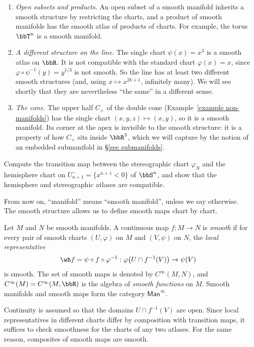 \begin{example}
\begin{enumerate}
        \item \emph{Open subsets and products.} An open subset of a smooth manifold inherits a smooth structure by restricting the charts, and a product of smooth manifolds has the smooth atlas of products of charts. For example, the torus $\bbT^n$ is a smooth manifold.
        \item \emph{A different structure on the line.} The single chart $\psi(x)=x^3$ is a smooth atlas on $\bbR$. It is not compatible with the standard chart $\varphi(x)=x$, since $\varphi\circ\psi^{-1}(y)=y^{1/3}$ is not smooth. So the line has at least two different smooth structures (and, using $x\mapsto x^{2k+1}$, infinitely many). We will see shortly that they are nevertheless ``the same'' in a different sense.
        \item \emph{The cone.} The upper half $C_+$ of the double cone (Example~\ref{example non-manifolds}) has the single chart $(x,y,z)\mapsto(x,y)$, so it is a smooth manifold. Its corner at the apex is invisible to the smooth structure: it is a property of how $C_+$ sits inside $\bbR^3$, which we will capture by the notion of an embedded submanifold in \S\ref{sec submanifolds}.
    \end{enumerate}
\end{example}

\begin{xca}\label{xca hemisphere stereographic}
    Compute the transition map between the stereographic chart $\varphi_N$ and the hemisphere chart on $U_{n+1}^-=\{x^{n+1}<0\}$ of $\bbS^n$, and show that the hemisphere and stereographic atlases are compatible.
\end{xca}

From now on, ``manifold'' means ``smooth manifold'', unless we say otherwise. The smooth structure allows us to define smooth maps chart by chart.

\begin{defn}
    Let $M$ and $N$ be smooth manifolds. A continuous map $f:M\to N$ is \emph{smooth} if for every pair of smooth charts $(U,\varphi)$ on $M$ and $(V,\psi)$ on $N$, the \emph{local representative}
    \[\wh f=\psi\circ f\circ\varphi^{-1}:\varphi\big(U\cap f^{-1}(V)\big)\to\psi(V)\]
    is smooth. The set of smooth maps is denoted by $C^\infty(M,N)$, and $C^\infty(M)=C^\infty(M,\bbR)$ is the algebra of \emph{smooth functions} on $M$. Smooth manifolds and smooth maps form the category $\mathsf{Man}^\infty$.
\end{defn}
Continuity is assumed so that the domains $U\cap f^{-1}(V)$ are open. Since local representatives in different charts differ by composition with transition maps, it suffices to check smoothness for the charts of any two atlases. For the same reason, composites of smooth maps are smooth.

